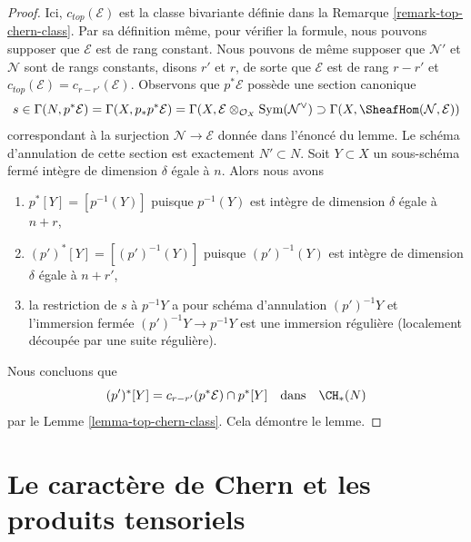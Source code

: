 \begin{proof}
Ici, $c_{top}(\mathcal{E})$ est la classe bivariante définie dans la
Remarque \ref{remark-top-chern-class}. Par sa définition même, pour
vérifier la formule, nous pouvons supposer que $\mathcal{E}$
est de rang constant. Nous pouvons de même supposer que $\mathcal{N}'$ et
$\mathcal{N}$ sont de rangs constants, disons $r'$ et $r$, de sorte que
$\mathcal{E}$ est de rang $r - r'$ et
$c_{top}(\mathcal{E}) = c_{r - r'}(\mathcal{E})$.
Observons que $p^*\mathcal{E}$ possède une section canonique
$$
s \in \Gamma(N, p^*\mathcal{E}) = \Gamma(X, p_*p^*\mathcal{E}) =
\Gamma(X, \mathcal{E} \otimes_{\mathcal{O}_X} \text{Sym}(\mathcal{N}^\vee)
\supset \Gamma(X, \SheafHom(\mathcal{N}, \mathcal{E}))
$$
correspondant à la surjection $\mathcal{N} \to \mathcal{E}$ donnée
dans l'énoncé du lemme. Le schéma d'annulation de cette section
est exactement $N' \subset N$. Soit $Y \subset X$ un sous-schéma fermé
intègre de dimension $\delta$ égale à $n$. Alors nous avons
\begin{enumerate}
\item $p^*[Y] = [p^{-1}(Y)]$ puisque $p^{-1}(Y)$ est intègre de
dimension $\delta$ égale à $n + r$,
\item $(p')^*[Y] = [(p')^{-1}(Y)]$ puisque $(p')^{-1}(Y)$ est intègre de
dimension $\delta$ égale à $n + r'$,
\item la restriction de $s$ à $p^{-1}Y$ a pour schéma d'annulation
$(p')^{-1}Y$ et l'immersion fermée $(p')^{-1}Y \to p^{-1}Y$
est une immersion régulière (localement découpée par une suite régulière).
\end{enumerate}
Nous concluons que
$$
(p')^*[Y] = c_{r - r'}(p^*\mathcal{E}) \cap p^*[Y]
\quad\text{dans}\quad \CH_*(N)
$$
par le Lemme \ref{lemma-top-chern-class}. Cela démontre le lemme.
\end{proof}










\section{Le caractère de Chern et les produits tensoriels}
\label{section-chern-classes-tensor}

